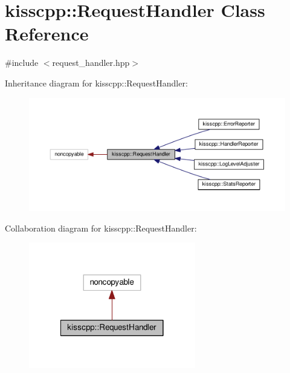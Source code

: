 \hypertarget{a00037}{\section{kisscpp\-:\-:Request\-Handler Class Reference}
\label{a00037}
}


{\ttfamily \#include $<$request\-\_\-handler.\-hpp$>$}



Inheritance diagram for kisscpp\-:\-:Request\-Handler\-:\nopagebreak
\begin{figure}[H]
\begin{center}
\leavevmode
\includegraphics[width=350pt]{a00160}
\end{center}
\end{figure}


Collaboration diagram for kisscpp\-:\-:Request\-Handler\-:\nopagebreak
\begin{figure}[H]
\begin{center}
\leavevmode
\includegraphics[width=206pt]{a00161}
\end{center}
\end{figure}
